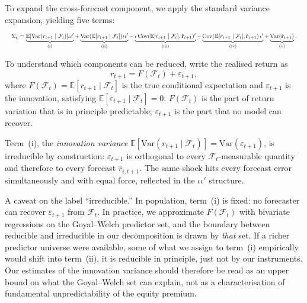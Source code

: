 \documentclass[a4paper,11pt]{article}
\begin{document}
To expand the cross-forecast component, we apply the standard variance
expansion, yielding five terms:
\begin{equation}\label{eq:cross-forecast-expand-resize}
\resizebox{\textwidth}{!}{$
    \Sigma_e =
    \underbrace{\mathbb{E}[\mathrm{Var}(r_{t+1} \mid \mathcal{F}_t)]
        \iota\iota'}_{\text{(i)}}
    + \underbrace{\mathrm{Var}(\mathbb{E}[r_{t+1} \mid \mathcal{F}_t])
        \iota\iota'}_{\text{(ii)}}
    - \underbrace{\iota\,\mathrm{Cov}(\mathbb{E}[r_{t+1} \mid \mathcal{F}_t],
        \hat{\mathbf{r}}_{t+1})'}_{\text{(iii)}}
    - \underbrace{\mathrm{Cov}(\mathbb{E}[r_{t+1} \mid \mathcal{F}_t],
        \hat{\mathbf{r}}_{t+1})\,\iota'}_{\text{(iv)}}
    + \underbrace{\mathrm{Var}(\hat{\mathbf{r}}_{t+1})}_{\text{(v)}}.
$}
\end{equation}

To understand which components can be reduced, write the realised return
as
\begin{equation}
    r_{t+1} = F(\mathcal{F}_t) + \varepsilon_{t+1},
\end{equation}
where $F(\mathcal{F}_t) = \mathbb{E}[r_{t+1} \mid \mathcal{F}_t]$ is the
true conditional expectation and $\varepsilon_{t+1}$ is the innovation,
satisfying $\mathbb{E}[\varepsilon_{t+1} \mid \mathcal{F}_t] = 0$.
$F(\mathcal{F}_t)$ is the part of return variation that is in principle
predictable; $\varepsilon_{t+1}$ is the part that no model can recover.

Term~(i), the \textit{innovation variance}
$\mathbb{E}[\mathrm{Var}(r_{t+1} \mid \mathcal{F}_t)] =
\mathrm{Var}(\varepsilon_{t+1})$, is irreducible by construction:
$\varepsilon_{t+1}$ is orthogonal to every $\mathcal{F}_t$-measurable
quantity and therefore to every forecast $\hat{r}_{i,t+1}$. The same shock
hits every forecast error simultaneously and with equal force, reflected
in the $\iota\iota'$ structure.

A caveat on the label ``irreducible.'' In population, term~(i) is fixed:
no forecaster can recover $\varepsilon_{t+1}$ from $\mathcal{F}_t$. In
practice, we approximate $F(\mathcal{F}_t)$ with bivariate regressions on
the Goyal--Welch predictor set, and the boundary between reducible and
irreducible in our decomposition is drawn by \emph{that} set. If a richer
predictor universe were available, some of what we assign to term~(i)
empirically would shift into term~(ii), it is reducible in principle,
just not by our instruments. Our estimates of the innovation variance
should therefore be read as an upper bound on what the Goyal--Welch set
can explain, not as a characterisation of fundamental unpredictability
of the equity premium.
\end{document}

